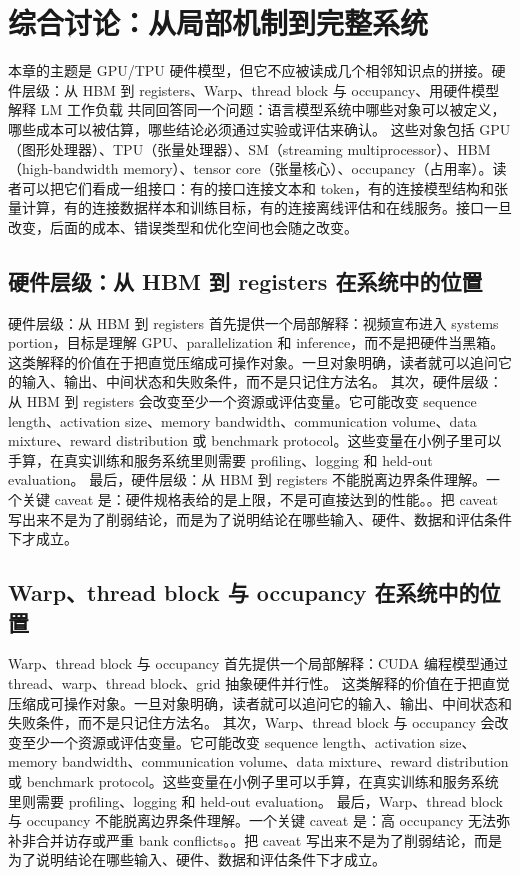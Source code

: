\documentclass[a4paper]{article}
\begin{document}
\section{综合讨论：从局部机制到完整系统}
本章的主题是 GPU/TPU 硬件模型，但它不应被读成几个相邻知识点的拼接。硬件层级：从 HBM 到 registers、Warp、thread block 与 occupancy、用硬件模型解释 LM 工作负载 共同回答同一个问题：语言模型系统中哪些对象可以被定义，哪些成本可以被估算，哪些结论必须通过实验或评估来确认。
这些对象包括 GPU（图形处理器）、TPU（张量处理器）、SM（streaming multiprocessor）、HBM（high-bandwidth memory）、tensor core（张量核心）、occupancy（占用率）。读者可以把它们看成一组接口：有的接口连接文本和 token，有的连接模型结构和张量计算，有的连接数据样本和训练目标，有的连接离线评估和在线服务。接口一旦改变，后面的成本、错误类型和优化空间也会随之改变。
\subsection{硬件层级：从 HBM 到 registers 在系统中的位置}
硬件层级：从 HBM 到 registers 首先提供一个局部解释：视频宣布进入 systems portion，目标是理解 GPU、parallelization 和 inference，而不是把硬件当黑箱。 这类解释的价值在于把直觉压缩成可操作对象。一旦对象明确，读者就可以追问它的输入、输出、中间状态和失败条件，而不是只记住方法名。
其次，硬件层级：从 HBM 到 registers 会改变至少一个资源或评估变量。它可能改变 sequence length、activation size、memory bandwidth、communication volume、data mixture、reward distribution 或 benchmark protocol。这些变量在小例子里可以手算，在真实训练和服务系统里则需要 profiling、logging 和 held-out evaluation。
最后，硬件层级：从 HBM 到 registers 不能脱离边界条件理解。一个关键 caveat 是：硬件规格表给的是上限，不是可直接达到的性能。。把 caveat 写出来不是为了削弱结论，而是为了说明结论在哪些输入、硬件、数据和评估条件下才成立。
\subsection{Warp、thread block 与 occupancy 在系统中的位置}
Warp、thread block 与 occupancy 首先提供一个局部解释：CUDA 编程模型通过 thread、warp、thread block、grid 抽象硬件并行性。 这类解释的价值在于把直觉压缩成可操作对象。一旦对象明确，读者就可以追问它的输入、输出、中间状态和失败条件，而不是只记住方法名。
其次，Warp、thread block 与 occupancy 会改变至少一个资源或评估变量。它可能改变 sequence length、activation size、memory bandwidth、communication volume、data mixture、reward distribution 或 benchmark protocol。这些变量在小例子里可以手算，在真实训练和服务系统里则需要 profiling、logging 和 held-out evaluation。
最后，Warp、thread block 与 occupancy 不能脱离边界条件理解。一个关键 caveat 是：高 occupancy 无法弥补非合并访存或严重 bank conflicts。。把 caveat 写出来不是为了削弱结论，而是为了说明结论在哪些输入、硬件、数据和评估条件下才成立。
\end{document}
